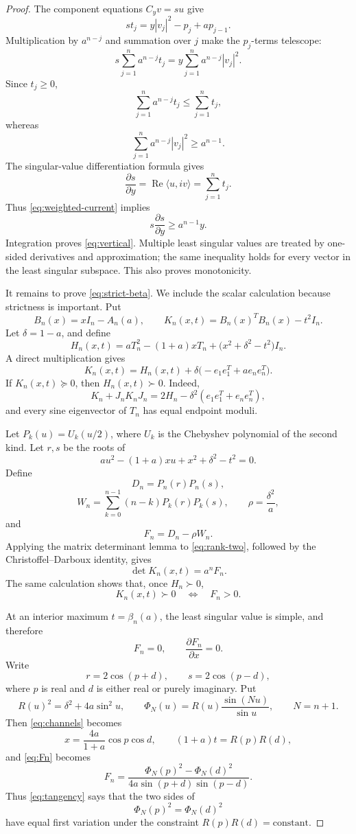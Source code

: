 \documentclass[11pt]{article}
\begin{document}
\begin{proof}
The component equations \(C_yv=su\) give
\[
st_j=y|v_j|^2-p_j+ap_{j-1}.
\tag{5}\label{eq:current}
\]
Multiplication by \(a^{n-j}\) and summation over \(j\) make the \(p_j\)-terms
telescope:
\[
s\sum_{j=1}^n a^{n-j}t_j
=
y\sum_{j=1}^n a^{n-j}|v_j|^2.
\tag{6}\label{eq:weighted-current}
\]
Since \(t_j\geq0\),
\[
\sum_{j=1}^n a^{n-j}t_j\leq\sum_{j=1}^nt_j,
\]
whereas
\[
\sum_{j=1}^n a^{n-j}|v_j|^2\geq a^{n-1}.
\]
The singular-value differentiation formula gives
\[
\frac{\partial s}{\partial y}
=
\operatorname{Re}\langle u,iv\rangle
=
\sum_{j=1}^nt_j.
\]
Thus \eqref{eq:weighted-current} implies
\[
s\frac{\partial s}{\partial y}\geq a^{n-1}y.
\]
Integration proves \eqref{eq:vertical}.  Multiple least singular values are
treated by one-sided derivatives and approximation; the same inequality holds
for every vector in the least singular subspace.  This also proves
monotonicity.

It remains to prove \eqref{eq:strict-beta}.  We include the scalar calculation
because strictness is important.  Put
\[
B_n(x)=xI_n-A_n(a),\qquad
K_n(x,t)=B_n(x)^TB_n(x)-t^2I_n.
\]
Let \(\delta=1-a\), and define
\[
H_n(x,t)
=
aT_n^2-(1+a)xT_n+
\bigl(x^2+\delta^2-t^2\bigr)I_n.
\]
A direct multiplication gives
\[
K_n(x,t)
=
H_n(x,t)+\delta\bigl(-e_1e_1^T+ae_ne_n^T\bigr).
\tag{7}\label{eq:rank-two}
\]
If \(K_n(x,t)\succeq0\), then \(H_n(x,t)\succ0\).  Indeed,
\[
K_n+J_nK_nJ_n
=
2H_n-\delta^2(e_1e_1^T+e_ne_n^T),
\]
and every sine eigenvector of \(T_n\) has equal endpoint moduli.

Let \(P_k(u)=U_k(u/2)\), where \(U_k\) is the Chebyshev polynomial of the
second kind.  Let \(r,s\) be the roots of
\[
au^2-(1+a)xu+x^2+\delta^2-t^2=0.
\tag{8}\label{eq:channels}
\]
Define
\[
D_n=P_n(r)P_n(s),
\]
\[
W_n=\sum_{k=0}^{n-1}(n-k)P_k(r)P_k(s),
\qquad
\rho=\frac{\delta^2}{a},
\]
and
\[
F_n=D_n-\rho W_n.
\]
Applying the matrix determinant lemma to \eqref{eq:rank-two}, followed by the
Christoffel--Darboux identity, gives
\[
\det K_n(x,t)=a^nF_n.
\tag{9}\label{eq:Fn}
\]
The same calculation shows that, once \(H_n\succ0\),
\[
K_n(x,t)\succ0
\quad\Longleftrightarrow\quad
F_n>0.
\tag{10}\label{eq:feasibility}
\]

At an interior maximum \(t=\beta_n(a)\), the least singular value is simple,
and therefore
\[
F_n=0,\qquad \frac{\partial F_n}{\partial x}=0.
\tag{11}\label{eq:tangency}
\]
Write
\[
r=2\cos(p+d),\qquad s=2\cos(p-d),
\]
where \(p\) is real and \(d\) is either real or purely imaginary.  Put
\[
R(u)^2=\delta^2+4a\sin^2u,
\qquad
\Phi_N(u)=R(u)\frac{\sin(Nu)}{\sin u},
\qquad N=n+1.
\]
Then \eqref{eq:channels} becomes
\[
x=\frac{4a}{1+a}\cos p\cos d,
\qquad
(1+a)t=R(p)R(d),
\tag{12}\label{eq:xt}
\]
and \eqref{eq:Fn} becomes
\[
F_n=
\frac{\Phi_N(p)^2-\Phi_N(d)^2}
{4a\sin(p+d)\sin(p-d)}.
\tag{13}\label{eq:angular-F}
\]
Thus \eqref{eq:tangency} says that the two sides of
\[
\Phi_N(p)^2=\Phi_N(d)^2
\tag{14}\label{eq:angular-tangency}
\]
have equal first variation under the constraint \(R(p)R(d)=\text{constant}\).


\end{proof}
\end{document}
